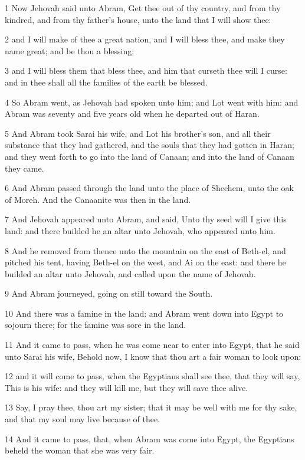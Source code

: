 \par 1 Now Jehovah said unto Abram, Get thee out of thy country, and from thy kindred, and from thy father's house, unto the land that I will show thee:
\par 2 and I will make of thee a great nation, and I will bless thee, and make they name great; and be thou a blessing;
\par 3 and I will bless them that bless thee, and him that curseth thee will I curse: and in thee shall all the families of the earth be blessed.
\par 4 So Abram went, as Jehovah had spoken unto him; and Lot went with him: and Abram was seventy and five years old when he departed out of Haran.
\par 5 And Abram took Sarai his wife, and Lot his brother's son, and all their substance that they had gathered, and the souls that they had gotten in Haran; and they went forth to go into the land of Canaan; and into the land of Canaan they came.
\par 6 And Abram passed through the land unto the place of Shechem, unto the oak of Moreh. And the Canaanite was then in the land.
\par 7 And Jehovah appeared unto Abram, and said, Unto thy seed will I give this land: and there builded he an altar unto Jehovah, who appeared unto him.
\par 8 And he removed from thence unto the mountain on the east of Beth-el, and pitched his tent, having Beth-el on the west, and Ai on the east: and there he builded an altar unto Jehovah, and called upon the name of Jehovah.
\par 9 And Abram journeyed, going on still toward the South.
\par 10 And there was a famine in the land: and Abram went down into Egypt to sojourn there; for the famine was sore in the land.
\par 11 And it came to pass, when he was come near to enter into Egypt, that he said unto Sarai his wife, Behold now, I know that thou art a fair woman to look upon:
\par 12 and it will come to pass, when the Egyptians shall see thee, that they will say, This is his wife: and they will kill me, but they will save thee alive.
\par 13 Say, I pray thee, thou art my sister; that it may be well with me for thy sake, and that my soul may live because of thee.
\par 14 And it came to pass, that, when Abram was come into Egypt, the Egyptians beheld the woman that she was very fair.

